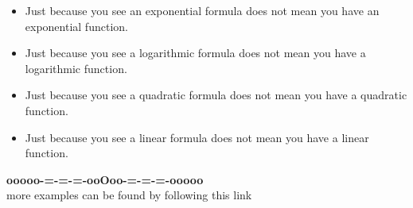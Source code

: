 \documentclass{ximera}
\begin{document}
\begin{warning}


\begin{itemize}
\item Just because you see an exponential formula does not mean you have an exponential function. \\ 
\item Just because you see a logarithmic formula does not mean you have a logarithmic function. \\ 
\item Just because you see a quadratic formula does not mean you have a quadratic function. \\ 
\item Just because you see a linear formula does not mean you have a linear function. \\ 
\end{itemize}

\end{warning}












\begin{center}
\textbf{\textcolor{green!50!black}{ooooo-=-=-=-ooOoo-=-=-=-ooooo}} \\

more examples can be found by following this link\\ 

\end{center}
\end{document}
